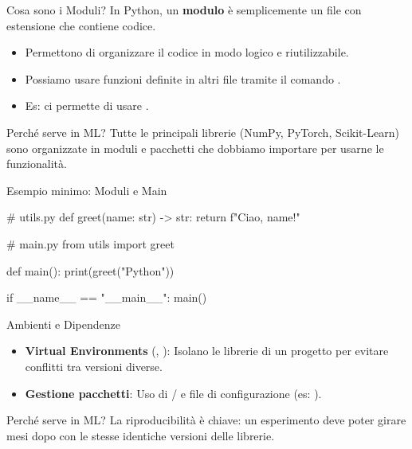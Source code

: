 \documentclass[12pt,aspectratio=169,notheorems]{beamer}
\begin{document}
\begin{frame}{Cosa sono i Moduli?}
    In Python, un \textbf{modulo} è semplicemente un file con estensione  che contiene codice.
    \begin{itemize}
        \item Permettono di organizzare il codice in modo logico e riutilizzabile.
        \item Possiamo usare funzioni definite in altri file tramite il comando .
        \item Es:  ci permette di usare .
    \end{itemize}
    \begin{mlblock}{Perché serve in ML?}
        Tutte le principali librerie (NumPy, PyTorch, Scikit-Learn) sono organizzate in moduli e pacchetti che dobbiamo importare per usarne le funzionalità.
    \end{mlblock}
\end{frame}

\begin{frame}[fragile]{Esempio minimo: Moduli e Main}
    \begin{python}
        # utils.py
        def greet(name: str) -> str:
            return f"Ciao, {name}!"

        # main.py
        from utils import greet

        def main():
            print(greet("Python"))

        if __name__ == "__main__":
            main()
    \end{python}
\end{frame}

\begin{frame}{Ambienti e Dipendenze}
    \begin{itemize}
        \item \textbf{Virtual Environments} (, ): Isolano le librerie di un progetto per evitare conflitti tra versioni diverse.
        \item \textbf{Gestione pacchetti}: Uso di  /  e file di configurazione (es: ).
    \end{itemize}
    \begin{mlblock}{Perché serve in ML?}
        La riproducibilità è chiave: un esperimento deve poter girare mesi dopo con le stesse identiche versioni delle librerie.
    \end{mlblock}
\end{frame}
\end{document}
